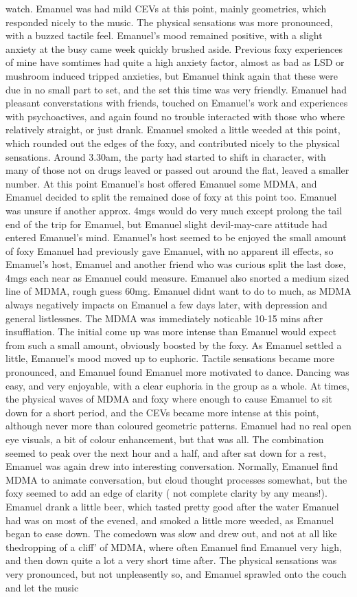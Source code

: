 \documentclass[12pt]{book}
\begin{document}
watch. Emanuel was had mild CEVs at this point, mainly geometrics, which responded nicely to the music. The physical sensations was more pronounced, with a buzzed tactile feel. Emanuel's mood remained positive, with a slight anxiety at the busy came week quickly brushed aside. Previous foxy experiences of mine have somtimes had quite a high anxiety factor, almost as bad as LSD or mushroom induced tripped anxieties, but Emanuel think again that these were due in no small part to set, and the set this time was very friendly. Emanuel had pleasant converstations with friends, touched on Emanuel's work and experiences with psychoactives, and again found no trouble interacted with those who where relatively straight, or just drank. Emanuel smoked a little weeded at this point, which rounded out the edges of the foxy, and contributed nicely to the physical sensations. Around 3.30am, the party had started to shift in character, with many of those not on drugs leaved or passed out around the flat, leaved a smaller number. At this point Emanuel's host offered Emanuel some MDMA, and Emanuel decided to split the remained dose of foxy at this point too. Emanuel was unsure if another approx. 4mgs would do very much except prolong the tail end of the trip for Emanuel, but Emanuel slight devil-may-care attitude had entered Emanuel's mind. Emanuel's host seemed to be enjoyed the small amount of foxy Emanuel had previously gave Emanuel, with no apparent ill effects, so Emanuel's host, Emanuel and another friend who was curious split the last dose, 4mgs each near as Emanuel could measure. Emanuel also snorted a medium sized line of MDMA, rough guess 60mg. Emanuel didnt want to do to much, as MDMA always negatively impacts on Emanuel a few days later, with depression and general listlessnes. The MDMA was immediately noticable 10-15 mins after insufflation. The initial come up was more intense than Emanuel would expect from such a small amount, obviously boosted by the foxy. As Emanuel settled a little, Emanuel's mood moved up to euphoric. Tactile sensations became more pronounced, and Emanuel found Emanuel more motivated to dance. Dancing was easy, and very enjoyable, with a clear euphoria in the group as a whole. At times, the physical waves of MDMA and foxy where enough to cause Emanuel to sit down for a short period, and the CEVs became more intense at this point, although never more than coloured geometric patterns. Emanuel had no real open eye visuals, a bit of colour enhancement, but that was all. The combination seemed to peak over the next hour and a half, and after sat down for a rest, Emanuel was again drew into interesting conversation. Normally, Emanuel find MDMA to animate conversation, but cloud thought processes somewhat, but the foxy seemed to add an edge of clarity ( not complete clarity by any means!). Emanuel drank a little beer, which tasted pretty good after the water Emanuel had was on most of the evened, and smoked a little more weeded, as Emanuel began to ease down. The comedown was slow and drew out, and not at all like thedropping of a cliff' of MDMA, where often Emanuel find Emanuel very high, and then down quite a lot a very short time after. The physical sensations was very pronounced, but not unpleasently so, and Emanuel sprawled onto the couch and let the music 
\end{document}
